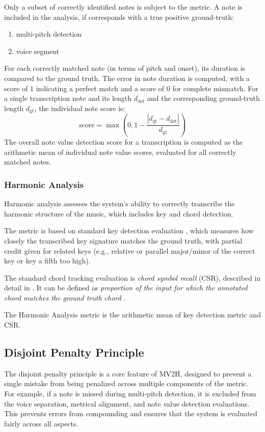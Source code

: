 Only a subset of correctly identified notes is subject to the metric. A note is included in the analysis, if corresponds with a true positive ground-truth: \begin{enumerate}
	\item multi-pitch detection
	\item voice segment
\end{enumerate}

For each correctly matched note (in terms of pitch and onset), its duration is compared to the ground truth. The error in note duration is computed, with a score of $1$ indicating a perfect match and a score of $0$ for complete mismatch. For a single transcription note and its length $d_{\textrm{det}}$ and the corresponding ground-truth length $d_{\textrm{gt}}$, the individual note score is: \[\textrm{score} = \max\left(0, 1 - \frac{\left|d_{\textrm{gt}} - d_{\textrm{det}}\right|}{d_{\textrm{gt}}}\right)\] The overall note value detection score for a transcription is computed as the arithmetic mean of individual note value scores, evaluated for all correctly matched notes. 

\subsubsection{Harmonic Analysis}

Harmonic analysis assesses the system’s ability to correctly transcribe the harmonic structure of the music, which includes key and chord detection. 

The metric is based on standard key detection evaluation \cite{Raffel2014}, which measures how closely the transcribed key signature matches the ground truth, with partial credit given for related keys (e.g., relative or parallel major/minor of the correct key or key a fifth too high).

The standard chord tracking evaluation is \emph{chord symbol recall} (CSR), described in detail in \cite{Harte2010}. It can be defined as \emph{proportion of the input for which the annotated chord matches the ground truth chord} \cite{McLeod2018}.

The Harmonic Analysis metric is the arithmetic mean of key detection metric and CSR.

\subsection{Disjoint Penalty Principle}

The disjoint penalty principle is a core feature of MV2H, designed to prevent a single mistake from being penalized across multiple components of the metric. For example, if a note is missed during multi-pitch detection, it is excluded from the voice separation, metrical alignment, and note value detection evaluations. This prevents errors from compounding and ensures that the system is evaluated fairly across all aspects.


